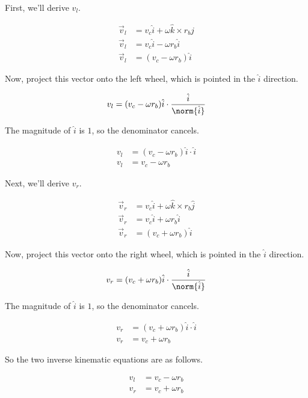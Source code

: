 First, we'll derive $v_l$.

\begin{align*}
  \vec{v}_l &= v_c \hat{i} + \omega \hat{k} \times r_b \hat{j} \\
  \vec{v}_l &= v_c \hat{i} - \omega r_b \hat{i} \\
  \vec{v}_l &= (v_c - \omega r_b) \hat{i}
\end{align*}

Now, project this vector onto the left wheel, which is pointed in the $\hat{i}$
direction.

\begin{equation*}
  v_l = (v_c - \omega r_b) \hat{i} \cdot \frac{\hat{i}}{\norm{\hat{i}}}
\end{equation*}

The magnitude of $\hat{i}$ is $1$, so the denominator cancels.

\begin{align}
  v_l &= (v_c - \omega r_b) \hat{i} \cdot \hat{i} \nonumber \\
  v_l &= v_c - \omega r_b \label{eq:diff_vl}
\end{align}

Next, we'll derive $v_r$.

\begin{align*}
  \vec{v}_r &= v_c \hat{i} + \omega \hat{k} \times r_b \hat{j} \\
  \vec{v}_r &= v_c \hat{i} + \omega r_b \hat{i} \\
  \vec{v}_r &= (v_c + \omega r_b) \hat{i}
\end{align*}

Now, project this vector onto the right wheel, which is pointed in the $\hat{i}$
direction.

\begin{equation*}
  v_r = (v_c + \omega r_b) \hat{i} \cdot \frac{\hat{i}}{\norm{\hat{i}}}
\end{equation*}

The magnitude of $\hat{i}$ is $1$, so the denominator cancels.

\begin{align}
  v_r &= (v_c + \omega r_b) \hat{i} \cdot \hat{i} \nonumber \\
  v_r &= v_c + \omega r_b \label{eq:diff_vr}
\end{align}

So the two inverse kinematic equations are as follows.

\begin{align}
  v_l &= v_c - \omega r_b \\
  v_r &= v_c + \omega r_b
\end{align}

